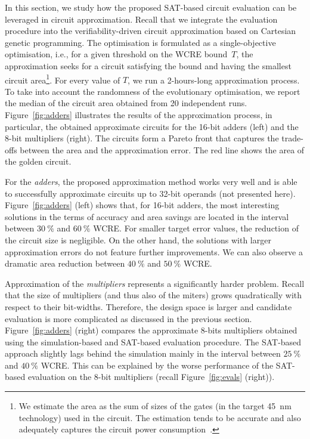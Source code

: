 \documentclass[runningheads]{llncs}
\begin{document}
In this section, we study how the proposed SAT-based circuit evaluation can be
leveraged in circuit approximation. Recall that we integrate the evaluation
procedure into the verifiability-driven circuit approximation based on Cartesian
genetic programming. The optimisation is formulated as a single-objective
optimisation, i.e., for a given threshold on the WCRE bound~$T$, the
approximation seeks for a circuit satisfying the bound and having the smallest
circuit area\footnote{We estimate the area as the sum of sizes of the gates (in
the target 45~nm technology) used in the circuit. The estimation tends to be
accurate and also adequately captures the circuit power
consumption~\cite{Vasicek:DATE17}.}. For every value of $T$, we run a
2-hours-long approximation process. To take into account the randomness of the
evolutionary optimisation, we report the median of the circuit area obtained
from 20 independent runs. Figure~\ref{fig:adders} illustrates the results of the
approximation process, in particular, the obtained approximate circuits for the
16-bit adders (left) and the 8-bit multipliers (right). The circuits form a
Pareto front that captures the trade-offs between the area and the approximation
error. The red line shows the area of the golden circuit. 

For the \emph{adders}, the proposed approximation method works very well and is
able to successfully approximate circuits up to 32-bit operands (not presented
here). Figure~\ref{fig:adders} (left) shows that, for 16-bit adders, the most
interesting solutions in the terms of accuracy and area savings are located in
the interval between $30\ \%$ and $60\ \%$ WCRE. For smaller target error
values, the reduction of the circuit size is negligible. On the other hand, the
solutions with larger approximation errors do not feature further improvements.
We can also observe  a dramatic area reduction between $40\ \%$ and $50\ \%$
WCRE.


Approximation of the \emph{multipliers} represents a significantly harder
problem. Recall that the size of multipliers (and thus also of the miters) grows
quadratically with respect to their bit-widths. Therefore, the design space is
larger and candidate evaluation is more complicated as discussed in the previous
section. Figure~\ref{fig:adders} (right) compares the approximate 8-bits
multipliers obtained using the simulation-based and SAT-based evaluation
procedure. The SAT-based approach slightly lags behind the simulation mainly in
the interval between $25\ \%$ and $40\ \%$ WCRE. This can be explained by the
worse  performance of the SAT-based evaluation on the 8-bit multipliers (recall
Figure~\ref{fig:evals} (right)).  
\end{document}
